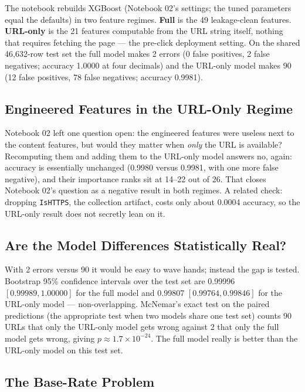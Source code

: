 \documentclass[stu,12pt,floatsintext]{apa7}
\newcommand{\code}[1]{\texttt{#1}}
\begin{document}
The notebook rebuilds XGBoost (Notebook 02's settings; the tuned
parameters equal the defaults) in two feature regimes. \textbf{Full} is
the 49 leakage-clean features. \textbf{URL-only} is the 21 features
computable from the URL string itself, nothing that requires fetching the
page --- the pre-click deployment setting. On the shared 46{,}632-row test
set the full model makes 2 errors (0 false positives, 2 false negatives;
accuracy 1.0000 at four decimals) and the URL-only model makes 90
(12 false positives, 78 false negatives; accuracy 0.9981).

\subsection{Engineered Features in the URL-Only Regime}

Notebook 02 left one question open: the engineered features were useless
next to the content features, but would they matter when \emph{only} the
URL is available? Recomputing them and adding them to the URL-only model
answers no, again: accuracy is essentially unchanged (0.9980 versus
0.9981, with one more false negative), and their importance ranks sit at
14--22 out of 26. That closes Notebook 02's question as a negative result
in both regimes. A related check: dropping \code{IsHTTPS}, the collection
artifact, costs only about 0.0004 accuracy, so the URL-only result does
not secretly lean on it.

\subsection{Are the Model Differences Statistically Real?}

With 2 errors versus 90 it would be easy to wave hands; instead the gap
is tested. Bootstrap 95\% confidence intervals over the test set are
0.99996 $[0.99989, 1.00000]$ for the full model and 0.99807
$[0.99764, 0.99846]$ for the URL-only model --- non-overlapping. McNemar's
exact test on the paired predictions (the appropriate test when two
models share one test set) counts 90 URLs that only the URL-only model
gets wrong against 2 that only the full model gets wrong, giving
$p \approx 1.7 \times 10^{-24}$. The full model really is better than the
URL-only model on this test set.

\subsection{The Base-Rate Problem}
\end{document}

